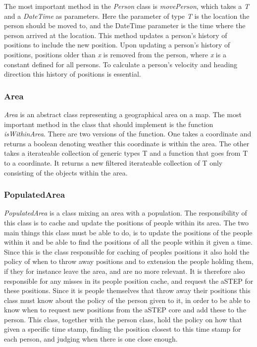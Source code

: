 The most important method in the \emph{Person} class is \emph{movePerson}, which takes a \emph{T} and a \emph{DateTime} as parameters. Here the parameter of type \emph{T} is the location the person should be moved to, and the DateTime parameter is the time where the person arrived at the location. This method updates a person's history of positions to include the new position. Upon updating a person's history of positions, positions older than \emph{x} is removed from the person, where \emph{x} is a constant defined for all persons. To calculate a person's velocity and heading direction this history of positions is essential.

\subsubsection{Area}
\emph{Area} is an abstract class representing a geographical area on a map. The most important method in the class that should implement is the function \emph{isWithinArea}. There are two versions of the function. One takes a coordinate and returns a boolean denoting weather this coordinate is within the area. The other takes a iterateable collection of generic types T and a function that goes from T to a coordinate. It returns a new filtered iterateable collection of T only consisting of the objects within the area.  

\subsubsection{PopulatedArea}
\emph{PopulatedArea} is a class mixing an area with a population. The responsibility of this class is to cache and update the positions of people within its area. The two main things this class must be able to do, is to update the positions of the people within it and be able to find the positions of all the people within it given a time. Since this is the class responsible for caching of peoples positions it also hold the policy of when to throw away positions and to extension the people holding them, if they for instance leave the area, and are no more relevant. It is therefore also responsible for any misses in its people position cache, and request the aSTEP for these positions. Since it is people themselves that throw away their positions this class must know about the policy of the person given to it, in order to be able to know when to request new positions from the aSTEP core and add these to the person. This class, together with the person class, hold the policy on how that given a specific time stamp, finding the position closest to this time stamp for each person, and judging when there is one close enough.

